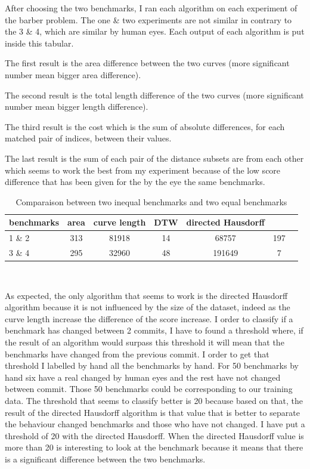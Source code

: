 \documentclass{article}
\begin{document}
After choosing the two benchmarks, I ran each algorithm on each experiment of the barber problem.
The one \& two experiments are not similar in contrary to the 3 \& 4, which are similar by human eyes.
Each output of each algorithm is put inside this tabular.


The first result is the area difference between the two curves (more significant number mean bigger area difference).

The second result is the total length difference of the two curves (more significant number mean bigger length difference).

The third result is the cost which is the sum of absolute differences, for each matched pair of indices, between their values.

The last result is the sum of each pair of the distance subsets are from each other which seems to work the best from my experiment because of the low score difference that has been given for the by the eye the same benchmarks.

\begin{table}[h!]
\begin{tabular}{|l|c|c|c|c|c|c|}
   \hline
   benchmarks  & area & curve length & DTW & directed Hausdorff \\
   \hline
   1 \&  2 & 313 & 81918 & 14 & 68757 & 197\\
   \hline
   3 \& 4  & 295 & 32960 & 48 & 191649 & 7 \\
   \hline
\end{tabular} \\ 
\caption{Comparaison between two inequal benchmarks and two equal benchmarks}
\label{result}
\end{table}


As expected, the only algorithm that seems to work is the directed Hausdorff algorithm because it is not influenced by the size of the dataset, indeed as the curve length increase the difference of the score increase. 
I order to classify if a benchmark has changed between 2 commits, I have to found a threshold where, if the result of an algorithm would surpass this threshold it will mean that the benchmarks have changed from the previous commit. I order to get that threshold I labelled by hand all the benchmarks by hand. For 50 benchmarks by hand six have a real changed by human eyes and the rest have not changed between commit. Those 50 benchmarks could be corresponding to our training data. The threshold that seems to classify better is 20 because based on that, the result of the directed Hausdorff algorithm is that value that is better to separate the behaviour changed benchmarks and those who have not changed.
I have put a threshold of 20 with the directed Hausdorff. When the directed Hausdorff value is more than 20 is interesting to look at the benchmark because it means that there is a significant difference between the two benchmarks.
\end{document}
